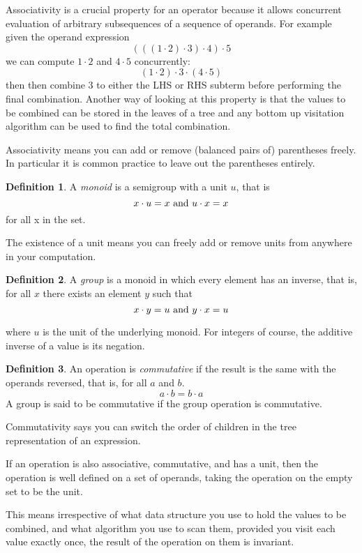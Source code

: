 \documentclass[oneside]{book}
\theoremstyle{plain}
\theoremstyle{definition}
\newtheorem{definition}{Definition}
\theoremstyle{plain}
\begin{document}
Associativity is a crucial property for an operator because it allows concurrent
evaluation of arbitrary subsequences of a sequence of operands. For example given
the operand expression 
$$(((1\cdot2)\cdot3)\cdot4)\cdot5$$
we can compute $1\cdot2$ and $4\cdot5$ concurrently:
$$(1\cdot2)\cdot3\cdot(4\cdot5)$$
then then combine 3 to either the LHS or RHS subterm before performing the final combination.
Another way of looking at this property is that the values to be combined can be stored in
the leaves of a tree and any bottom up visitation algorithm can be used to find the total combination.

Associativity means you can add or remove (balanced pairs of) parentheses freely.
In particular it is common practice to leave out the parentheses entirely.

\begin{definition}
A {\em monoid} is a semigroup with a unit $u$, that is
$$x\cdot u = x {\rm \ and\ }u \cdot x = x$$
for all x in the set.
\end{definition}

The existence of a unit means you can freely add or remove units from
anywhere in your computation.

\begin{definition}
A {\em group} is a monoid in which every element has an inverse, that is,
for all $x$ there exists an element $y$ such that
$$x \cdot y = u {\rm\ and\ } y \cdot x = u $$
\end{definition}
where $u$ is the unit of the underlying monoid. For integers of course,
the additive inverse of a value is its negation.

\begin{definition}
An operation is {\em commutative} if the result is the same with the operands
reversed, that is, for all $a$ and $b$.
$$a \cdot b = b \cdot a$$
A group is said to be commutative if the group operation is commutative.
\end{definition}

Commutativity says you can switch the order of children in the tree representation
of an expression.

If an operation is also associative, commutative, and has a unit, then the operation
is well defined on a set of operands, taking the operation on the empty
set to be the unit. 

This means irrespective of what data structure you use to hold the
values to be combined, and what algorithm you use to scan them,
provided you visit each value exactly once, the result of the
operation on them is invariant.
\end{document}

